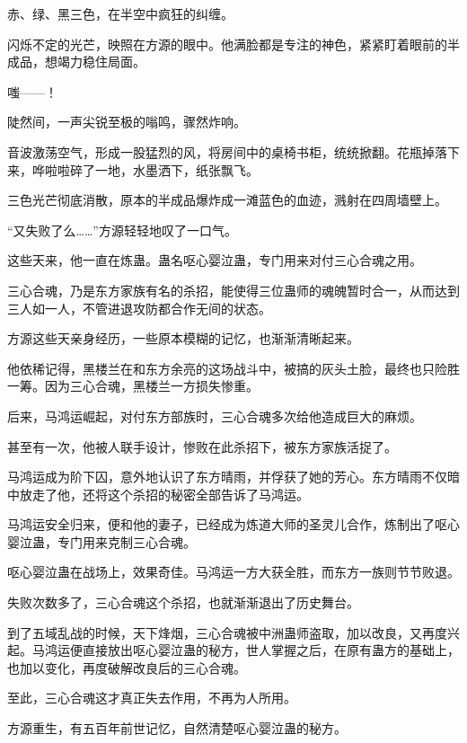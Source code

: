 
\begin{this_body}



赤、绿、黑三色，在半空中疯狂的纠缠。

闪烁不定的光芒，映照在方源的眼中。他满脸都是专注的神色，紧紧盯着眼前的半成品，想竭力稳住局面。

嗤——！

陡然间，一声尖锐至极的嗡鸣，骤然炸响。

音波激荡空气，形成一股猛烈的风，将房间中的桌椅书柜，统统掀翻。花瓶掉落下来，哗啦啦碎了一地，水墨洒下，纸张飘飞。

三色光芒彻底消散，原本的半成品爆炸成一滩蓝色的血迹，溅射在四周墙壁上。

“又失败了么……”方源轻轻地叹了一口气。

这些天来，他一直在炼蛊。蛊名呕心婴泣蛊，专门用来对付三心合魂之用。

三心合魂，乃是东方家族有名的杀招，能使得三位蛊师的魂魄暂时合一，从而达到三人如一人，不管进退攻防都合作无间的状态。

方源这些天亲身经历，一些原本模糊的记忆，也渐渐清晰起来。

他依稀记得，黑楼兰在和东方余亮的这场战斗中，被搞的灰头土脸，最终也只险胜一筹。因为三心合魂，黑楼兰一方损失惨重。

后来，马鸿运崛起，对付东方部族时，三心合魂多次给他造成巨大的麻烦。

甚至有一次，他被人联手设计，惨败在此杀招下，被东方家族活捉了。

马鸿运成为阶下囚，意外地认识了东方晴雨，并俘获了她的芳心。东方晴雨不仅暗中放走了他，还将这个杀招的秘密全部告诉了马鸿运。

马鸿运安全归来，便和他的妻子，已经成为炼道大师的圣灵儿合作，炼制出了呕心婴泣蛊，专门用来克制三心合魂。

呕心婴泣蛊在战场上，效果奇佳。马鸿运一方大获全胜，而东方一族则节节败退。

失败次数多了，三心合魂这个杀招，也就渐渐退出了历史舞台。

到了五域乱战的时候，天下烽烟，三心合魂被中洲蛊师盗取，加以改良，又再度兴起。马鸿运便直接放出呕心婴泣蛊的秘方，世人掌握之后，在原有蛊方的基础上，也加以变化，再度破解改良后的三心合魂。

至此，三心合魂这才真正失去作用，不再为人所用。

方源重生，有五百年前世记忆，自然清楚呕心婴泣蛊的秘方。


\end{this_body}
